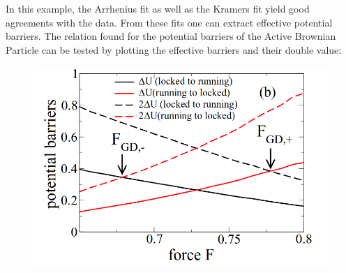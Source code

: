 \documentclass[12pt,a4paper]{article}
\begin{document}
In this example, the Arrhenius fit as well as the Kramers fit yield good agreements with the data. From these fits one can extract effective potential barriers. The relation found for the potential barriers of the Active Brownian Particle can be tested by plotting the effective barriers and their double value:
\begin{figure}	\includegraphics[scale=0.25]{barrierplot.png}\
\end{figure}



\end{document}
